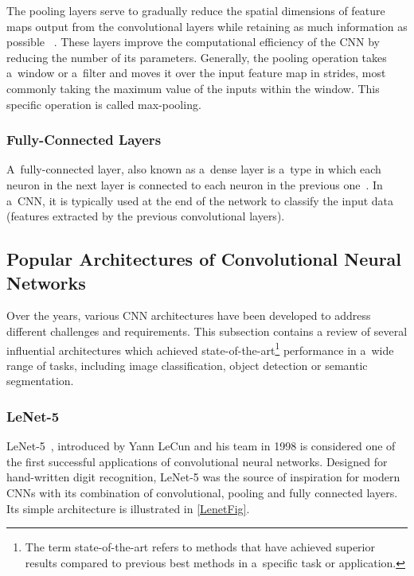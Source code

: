 The pooling layers serve to gradually reduce the spatial dimensions of feature
maps output from the convolutional layers while retaining as much information as
possible ~\cite{OShea2015}. These layers improve the computational efficiency of
the CNN by reducing the number of its parameters. Generally, the pooling
operation takes a~window or a~filter and moves it over the input feature map in
strides, most commonly taking the maximum value of the inputs within the window.
This specific operation is called max-pooling.


\subsubsection{Fully-Connected Layers}

A~fully-connected layer, also known as a~dense layer is a~type in which each
neuron in the next layer is connected to each neuron in the previous
one~\cite{OShea2015}. In a~CNN, it is typically used at the end of the network
to classify the input data (features extracted by the previous convolutional
layers).


\subsection{Popular Architectures of Convolutional Neural Networks}

Over the years, various CNN architectures have been developed to address
different challenges and requirements. This subsection contains a review of several
influential architectures which achieved state-of-the-art\footnote{The term
state-of-the-art refers to methods that have achieved superior results
compared to previous best methods in a~specific task or application.}
performance in a~wide range of tasks, including image classification, object
detection or semantic segmentation.

\subsubsection{LeNet-5}

LeNet-5~\cite{Lecun1998}, introduced by Yann LeCun and his team in 1998 is
considered one of the first successful applications of convolutional neural
networks. Designed for hand-written digit recognition, LeNet-5 was the source of
inspiration for modern CNNs with its combination of convolutional, pooling and
fully connected layers. Its simple architecture is illustrated in
\autoref{LenetFig}.

